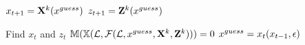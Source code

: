 \documentclass[12pt]{article}
\begin{document}
\begin{algorithm}
$x_{t+1}=\mathbf{X}^k(x^{guess}_{})$\;
$z_{t+1}=\mathbf{Z}^k(x^{guess}_{})$\;
\caption{$\fSum(\linMod, \xguss, \XWOarg^k, \ZWOarg^k, N)$} 
\label{fSum}
\end{algorithm}


\begin{algorithm}
Find $x_t$ and $z_t$
$\mathbb{M}(\mathbb{X}({\mathcal{L}},\mathcal{F}({\mathcal{L}},x^{guess}_{},\mathbf{X}^k,\mathbf{Z}^k)))=0$\;
$x^{guess}_{}=x_t(x_{t-1},\epsilon)$\;
\caption{$\xWOarg^{k+1}(x_{t-1},\epsilon_t)$, $\zWOarg^{k+1}(x_{t-1},\epsilon_t)$}
\label{theSys}
\end{algorithm}







\end{document}
